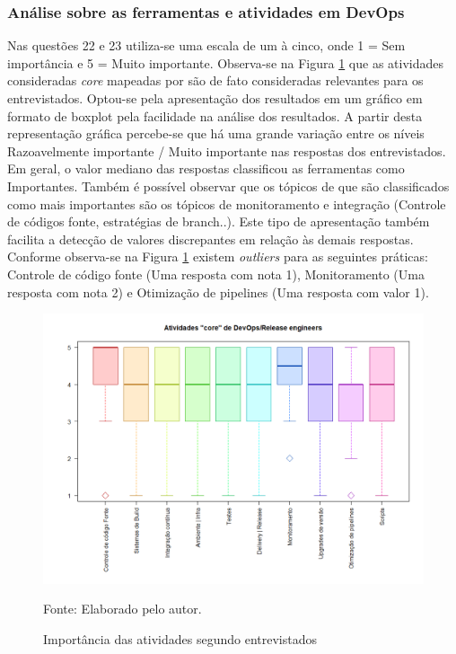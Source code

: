 \documentclass[twoside,english,brazilian]{UNISINOSartigo}
\newcommand{\source}[1]{\caption*{Fonte: {#1}} }
\begin{document}
\subsubsection{Análise sobre as ferramentas e atividades em DevOps}
Nas questões 22 e 23 utiliza-se uma escala de um à cinco, onde 1 = Sem importância e 5 = Muito importante.
Observa-se na Figura \ref{fig:importanciapratDevOps} que as atividades consideradas \textit{core} mapeadas por  são de fato consideradas relevantes para os entrevistados. Optou-se pela apresentação dos resultados em um gráfico em formato de boxplot pela facilidade na análise dos resultados. A partir desta representação gráfica percebe-se que há uma grande variação entre os níveis Razoavelmente importante / Muito importante nas respostas dos entrevistados. Em geral, o valor mediano das respostas classificou as ferramentas como Importantes. Também é possível observar que os tópicos de que são classificados como mais importantes são os tópicos de monitoramento e integração (Controle de códigos fonte, estratégias de branch..). 
Este tipo de apresentação também facilita a detecção de valores discrepantes em relação às demais respostas. Conforme observa-se na Figura \ref{fig:importanciapratDevOps} existem \textit{outliers} para as seguintes práticas: Controle de código fonte (Uma resposta com nota 1), Monitoramento (Uma resposta com nota 2) e Otimização de pipelines (Uma resposta com valor 1).

\begin{figure}[h]
    \centering
    \caption{Importância das atividades segundo entrevistados}
       \includegraphics[scale=.5]{imagens/Rplot.png}
        \source{Elaborado pelo autor.}
    \label{fig:importanciapratDevOps}
\end{figure}
\end{document}
